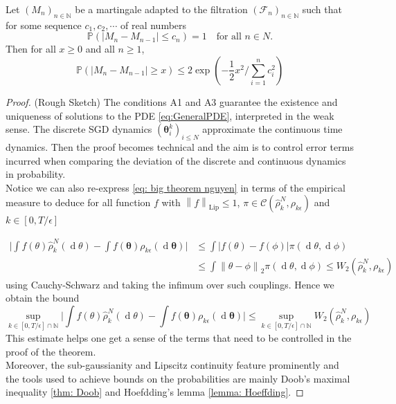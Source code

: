 \documentclass{article}
\theoremstyle{mystyle}
\newcommand{\N}{\ensuremath{\mathbb{N}}}
\newcommand{\PP}{\ensuremath{\mathbb{P}}}
\newcommand{\F}{\mathcal{F}}
\newcommand{\norm}[1]{\left\lVert#1\right\rVert}
\newcommand{\diff}{\ensuremath{\operatorname{d}\!}}
\begin{document}
\begin{boxlemma}\label{lemma: Hoeffding}
Let $ (M_{n})_{n\in\N}$ be a martingale adapted to the filtration $ (\F_{n})_{n\in\N}$ such that for some sequence $ c_{1}, c_{2},\cdots$ of real numbers 
\begin{equation}
	\PP(|M_{n}-M_{n-1}|\leq c_{n}) = 1 \quad \text{for all } n\in N.
\end{equation}
Then for all $ x\geq 0$ and all $ n\geq 1$,
\begin{equation}
    \PP(|M_{n}-M_{n-1}|\geq x)\leq 2 \exp \left( -\frac{1}{2}x^{2}\Big/\displaystyle\sum^{n}_{i=1}c_{i}^{2}  \right)
\end{equation}


\end{boxlemma}


\begin{proof}{(Rough Sketch)}
	The conditions {\sf A1} and {\sf A3} guarantee the existence and uniqueness of solutions to the PDE \ref{eq:GeneralPDE}, interpreted in the weak sense. The discrete SGD dynamics $ (\mathbf{\theta}_{i}^{k})_{i\leq N }$ approximate the continuous time dynamics. Then the proof becomes technical and the aim is to control error terms incurred when comparing the deviation of the discrete and continuous dynamics in probability.\\ 

    Notice we can also re-express \ref{eq: big theorem nguyen} in terms of the empirical measure to deduce for all function $ f$ with $ \norm{f}_{\text{Lip}}\leq 1$, $ \pi \in \mathcal{C}(\hat{\rho}^{N}_{k}, \rho_{k\epsilon})$ and $ k\in [0,T/\epsilon]$

\begin{equation}
	\begin{array}{ll}
	\Big|\displaystyle\int f(\theta)\hat{\rho}^{N}_{k}(\diff \theta)- \int\!
	f(\mathbf{\theta})  \rho_{k\epsilon}(\diff \mathbf{\theta}) \Big| &\leq  \displaystyle\int |f(\theta)-f(\phi)|\pi(\diff \theta, \diff \phi)\\ 
									  &\leq \displaystyle\int \norm{\theta-\phi}_{2}\pi(\diff \theta, \diff \phi)\leq W_{2}(\hat{\rho}^{N}_{k}, \rho_{k\epsilon}) 

\end{array}
\end{equation}
using Cauchy-Schwarz and taking the infimum over such couplings. Hence we obtain the bound 
\begin{equation}
    \sup_{k \in  [0, T/\epsilon] \cap \N}\Big|\displaystyle\int f(\theta)\hat{\rho}^{N}_{k}(\diff \theta)- \int\!
	f(\mathbf{\theta})  \rho_{k\epsilon}(\diff \mathbf{\theta}) \Big|\leq  \sup_{k \in  [0, T/\epsilon] \cap \N} W_{2}(\hat{\rho}^{N}_{k}, \rho_{k\epsilon}) 
\end{equation}
This estimate helps one get a sense of the terms that need to be controlled in the proof of the theorem.\\

	Moreover, the sub-gaussianity and Lipscitz continuity feature prominently and the tools used to achieve bounds on the probabilities are mainly Doob's maximal inequality \ref{thm: Doob} and Hoefdding's lemma \ref{lemma: Hoeffding}. 
\end{proof}
\end{document}
